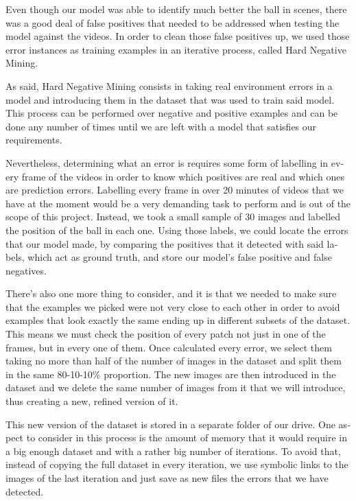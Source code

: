 \begin{otherlanguage}{english}
Even though our model was able to identify much better the ball in scenes, there was a good deal of false positives that needed to be addressed when testing the model against the videos. In order to clean those false positives up, we used those error instances as training examples in an iterative process, called Hard Negative Mining.

As said, Hard Negative Mining consists in taking real environment errors in a model and introducing them in the dataset that was used to train said model. This process can be performed over negative and positive examples and can be done any number of times until we are left with a model that satisfies our requirements.

Nevertheless, determining what an error is requires some form of labelling in every frame of the videos in order to know which positives are real and which ones are prediction errors. Labelling every frame in over 20 minutes of videos that we have at the moment would be a very demanding task to perform and is out of the scope of this project. Instead, we took a small sample of 30 images and labelled the position of the ball in each one. Using those labels, we could locate the errors that our model made, by comparing the positives that it detected with said labels, which act as ground truth, and store our model's false positive and false negatives.

There's also one more thing to consider, and it is that we needed to make sure that the examples we picked were not very close to each other in order to avoid examples that look exactly the same ending up in different subsets of the dataset. This means we must check the position of every patch not just in one of the frames, but in every one of them. Once calculated every error, we select them taking no more than half of the number of images in the dataset and split them in the same 80-10-10\% proportion. The new images are then introduced in the dataset and we delete the same number of images from it that we will introduce, thus creating a new, refined version of it. 

This new version of the dataset is stored in a separate folder of our drive. One aspect to consider in this process is the amount of memory that it would require in a big enough dataset and with a rather big number of iterations. To avoid that, instead of copying the full dataset in every iteration, we use symbolic links to the images of the last iteration and just save as new files the errors that we have detected.


\end{otherlanguage}
